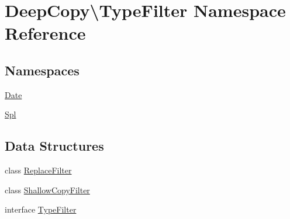 \hypertarget{namespace_deep_copy_1_1_type_filter}{}\section{Deep\+Copy\textbackslash{}Type\+Filter Namespace Reference}
\label{namespace_deep_copy_1_1_type_filter}
\subsection*{Namespaces}
\begin{DoxyCompactItemize}
\item 
 \mbox{\hyperlink{namespace_deep_copy_1_1_type_filter_1_1_date}{Date}}
\item 
 \mbox{\hyperlink{namespace_deep_copy_1_1_type_filter_1_1_spl}{Spl}}
\end{DoxyCompactItemize}
\subsection*{Data Structures}
\begin{DoxyCompactItemize}
\item 
class \mbox{\hyperlink{class_deep_copy_1_1_type_filter_1_1_replace_filter}{Replace\+Filter}}
\item 
class \mbox{\hyperlink{class_deep_copy_1_1_type_filter_1_1_shallow_copy_filter}{Shallow\+Copy\+Filter}}
\item 
interface \mbox{\hyperlink{interface_deep_copy_1_1_type_filter_1_1_type_filter}{Type\+Filter}}
\end{DoxyCompactItemize}

